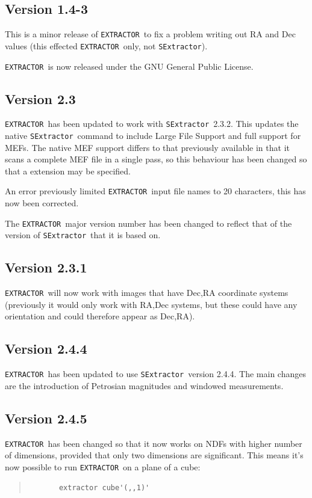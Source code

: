 \documentclass[twoside,11pt]{article}
\renewcommand{\_}{\texttt{\symbol{95}}}
\newcommand{\EXTRACTOR}{\texttt{EXTRACTOR}}
\newcommand{\SExtractor}{\texttt{SExtractor}}
\begin{document}
\subsection{Version 1.4-3}

 This is a minor release of \EXTRACTOR\ to fix a problem writing out
 RA and Dec values (this effected \EXTRACTOR\ only, not \SExtractor).

 \EXTRACTOR\ is now released under the GNU General Public License.

\subsection{Version 2.3}

 \EXTRACTOR\ has been updated to work with \SExtractor\ 2.3.2.
 This updates the native \SExtractor\ command to include Large File Support
 and full support for MEFs. The native MEF support differs to that previously
 available in that it scans a complete MEF file in a single pass, so this
 behaviour has been changed so that a extension may be specified.

 An error previously limited \EXTRACTOR\ input file names to 20 characters,
 this has now been corrected.

 The \EXTRACTOR\ major version number has been changed to reflect that of the
 version of \SExtractor\ that it is based on.

\subsection{Version 2.3.1}

 \EXTRACTOR\ will now work with images that have Dec,RA coordinate systems
 (previously it would only work with RA,Dec systems, but these could have
 any orientation and could therefore appear as Dec,RA).

\subsection{Version 2.4.4}

 \EXTRACTOR\ has been updated to use \SExtractor\ version 2.4.4. The main
 changes are the introduction of Petrosian magnitudes and windowed
 measurements.

\subsection{Version 2.4.5}

 \EXTRACTOR\ has been changed so that it now works on NDFs with higher
 number of dimensions, provided that only two dimensions are significant.
 This means it's now possible to run \EXTRACTOR\ on a plane of a cube:
 \begin{quote}
 \begin{verbatim}
       extractor cube'(,,1)'
 \end{verbatim}
 \end{quote}
\end{document}
